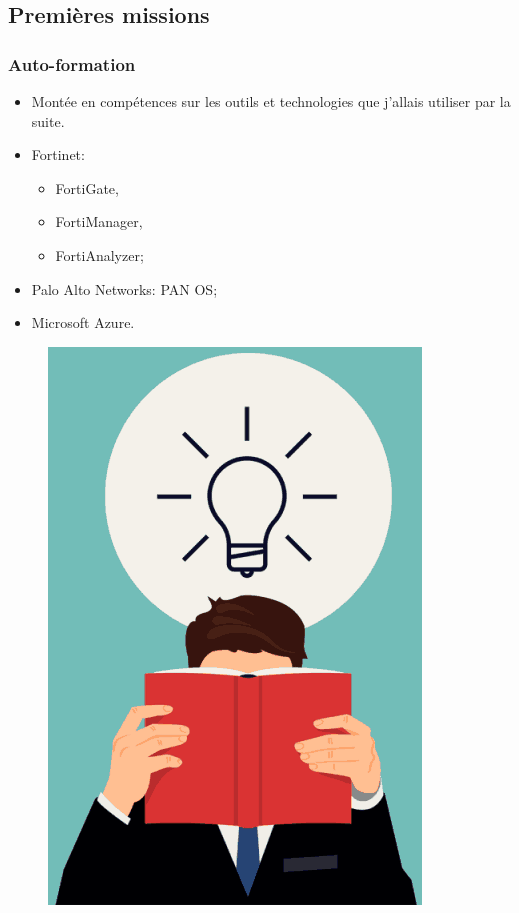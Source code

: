 \documentclass[french, a4paper]{beamer}
\begin{document}
\subsection{Premières missions}

\begin{frame}
    \frametitle{Auto-formation}
    \begin{minipage}{0.6\textwidth}
        \begin{itemize}
            \item Montée en compétences sur les outils et technologies que
                j'allais utiliser par la suite.
            \item Fortinet:
            \begin{itemize}
                \item FortiGate,
                \item FortiManager,
                \item FortiAnalyzer;
            \end{itemize}
            \item Palo Alto Networks: PAN OS\@;
            \item Microsoft Azure.
        \end{itemize}
    \end{minipage}%
    \hfill
    \begin{minipage}{0.4\textwidth}
        \begin{figure}[h!]
            \centering
            \includegraphics[width = 0.8\linewidth]{img/misc/self-learning.png}%
            \label{fig:misc/self-learning}
        \end{figure}
    \end{minipage}
\end{frame}
\end{document}
